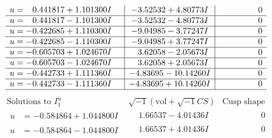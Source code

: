 \documentclass[1p]{elsarticle_modified}
\theoremstyle{definition}
\newcommand{\I}{\sqrt{-1}}
\begin{document}
$$\begin{array}{c|c|c}
\begin{aligned}
u &= \phantom{-}0.441817 + 1.101300 I\end{aligned}
 & -3.52532 + 4.80773 I & \phantom{-0.000000 } 0 \\ \hline\begin{aligned}
u &= \phantom{-}0.441817 - 1.101300 I\end{aligned}
 & -3.52532 - 4.80773 I & \phantom{-0.000000 } 0 \\ \hline\begin{aligned}
u &= -0.422685 + 1.110300 I\end{aligned}
 & -9.04985 - 3.77247 I & \phantom{-0.000000 } 0 \\ \hline\begin{aligned}
u &= -0.422685 - 1.110300 I\end{aligned}
 & -9.04985 + 3.77247 I & \phantom{-0.000000 } 0 \\ \hline\begin{aligned}
u &= -0.605703 + 1.024670 I\end{aligned}
 & \phantom{-}3.62058 - 2.05673 I & \phantom{-0.000000 } 0 \\ \hline\begin{aligned}
u &= -0.605703 - 1.024670 I\end{aligned}
 & \phantom{-}3.62058 + 2.05673 I & \phantom{-0.000000 } 0 \\ \hline\begin{aligned}
u &= -0.442733 + 1.111360 I\end{aligned}
 & -4.83695 - 10.14260 I & \phantom{-0.000000 } 0 \\ \hline\begin{aligned}
u &= -0.442733 - 1.111360 I\end{aligned}
 & -4.83695 + 10.14260 I & \phantom{-0.000000 } 0\\
 \hline 
 \end{array}$$\newpage$$\begin{array}{c|c|c}  
\text{Solutions to }I^u_{1}& \I (\text{vol} + \sqrt{-1}CS) & \text{Cusp shape}\\
 \hline 
\begin{aligned}
u &= -0.584864 + 1.044800 I\end{aligned}
 & \phantom{-}1.66537 - 4.01436 I & \phantom{-0.000000 } 0 \\ \hline\begin{aligned}
u &= -0.584864 - 1.044800 I\end{aligned}
 & \phantom{-}1.66537 + 4.01436 I & \phantom{-0.000000 } 0 \\ \hline\begin{aligned}

\end{aligned}
\end{array}$$
\end{document}
